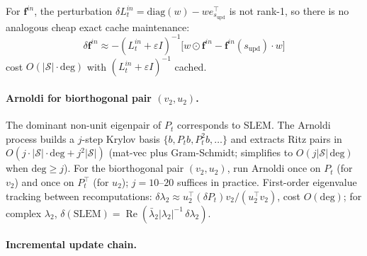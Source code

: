 \documentclass[10pt,a4paper]{article}
\begin{document}
For $\mathbf{f}^{in}$, the perturbation $\delta L^{in}_t = \mathrm{diag}(w)-we_{s_{\mathrm{upd}}}^\top$ is not rank-1,
so there is no analogous cheap exact cache maintenance:
\[
  \delta\mathbf{f}^{in} \approx -(L^{in}_t+\varepsilon I)^{-1}\bigl[w\odot\mathbf{f}^{in} - \mathbf{f}^{in}(s_{\mathrm{upd}})\cdot w\bigr]
\]
cost $O(|\mathcal{S}|\cdot\mathrm{deg})$ with $(L^{in}_t+\varepsilon I)^{-1}$ cached.


\paragraph{Arnoldi for biorthogonal pair $(v_2, u_2)$.}

The dominant non-unit eigenpair of $P_t$ corresponds to SLEM.  The Arnoldi process
builds a $j$-step Krylov basis $\{b, P_t b, P_t^2 b, \ldots\}$ and extracts
Ritz pairs in $O(j \cdot |\mathcal{S}| \cdot \mathrm{deg} + j^2|\mathcal{S}|)$ (mat-vec plus
Gram-Schmidt; simplifies to $O(j|\mathcal{S}|\,\mathrm{deg})$ when $\mathrm{deg} \geq j$).
For the biorthogonal pair $(v_2, u_2)$, run Arnoldi once on $P_t$
(for $v_2$) and once on $P_t^\top$ (for $u_2$); $j = 10$--$20$ suffices in practice.
First-order eigenvalue tracking between recomputations: $\delta\lambda_2 \approx
u_2^\top(\delta P_t)v_2 / (u_2^\top v_2)$, cost $O(\mathrm{deg})$; for complex $\lambda_2$,
$\delta(\mathrm{SLEM}) = \operatorname{Re}(\bar\lambda_2|\lambda_2|^{-1}\,\delta\lambda_2)$.


\paragraph{Incremental update chain.}
\end{document}
